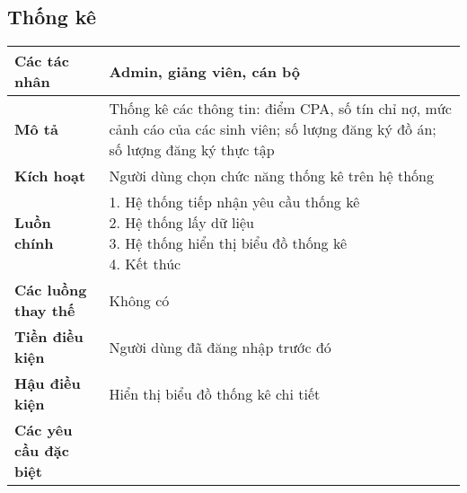 	\subsection*{Thống kê}
	\begin{tabular}{|l|p{}|}
		\hline
		\textbf{Các tác nhân}         & Admin, giảng viên, cán bộ                                                                                           \\
		\hline
		\textbf{Mô tả}                & Thống kê các thông tin: điểm CPA, số tín chỉ nợ, mức cảnh cáo của các sinh viên; số lượng đăng ký đồ án; số lượng đăng ký thực tập \\
		\hline
		\textbf{Kích hoạt}            & Người dùng chọn chức năng thống kê trên hệ thống                                                                                   \\
		\hline
		\textbf{Luồn chính}           & \makecell[l]{1. Hệ thống tiếp nhận yêu cầu thống kê                                                                                \\ 2. Hệ thống lấy dữ liệu \\ 3. Hệ thống hiển thị biểu đồ thống kê \\ 4. Kết thúc} \\
		\hline
		\textbf{Các luồng thay thế}   & Không có                                                                                                                           \\
		\hline
		\textbf{Tiền điều kiện}       & Người dùng đã đăng nhập trước đó                                                                                                   \\
		\hline
		\textbf{Hậu điều kiện}        & Hiển thị biểu đồ thống kê chi tiết                                                                                                 \\
		\hline
		\textbf{Các yêu cầu đặc biệt} &                                                                                                                                    \\
		\hline
	\end{tabular}

